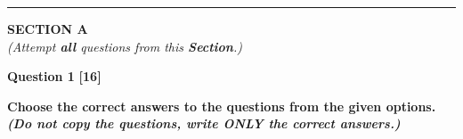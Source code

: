 \documentclass[12pt,a4paper]{article}
\newcommand{\qmarks}[1]{\hfill\textbf{[#1]}}
\begin{document}
\vspace{2pt}
\noindent\rule{\textwidth}{0.4pt}

\vspace{8pt}
\begin{center}
    {\large\bfseries SECTION A}\\[2pt]
    \textit{(Attempt \textbf{all} questions from this \textbf{Section}.)}
\end{center}

\vspace{4pt}

\textbf{Question 1} \qmarks{16}

\textbf{Choose the correct answers to the questions from the given options.}\\
\textbf{\textit{(Do not copy the questions, write ONLY the correct answers.)}}
\end{document}
